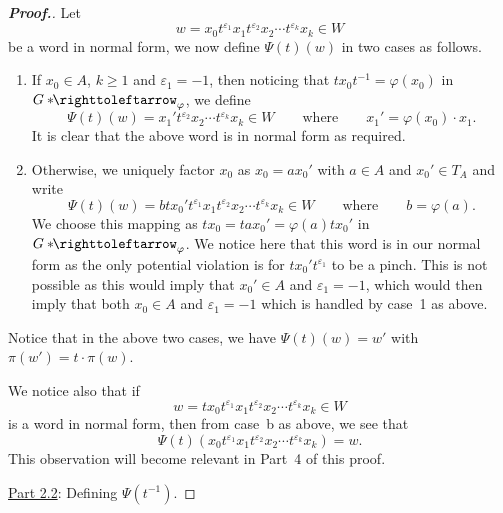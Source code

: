 \documentclass[11pt,a4paper,reqno]{amsart}
\theoremstyle{plain}
\theoremstyle{definition}
\theoremstyle{definition}
\renewcommand\geq\geqslant
\newenvironment{myproof}{\begin{proof}[\normalfont\bfseries Proof.]}{\end{proof}}
\newcommand\hnn{*\!\!\righttoleftarrow}
\begin{document}
\begin{myproof}
	\smallskip
	\noindent
	Let
	\[
		w = x_0 t^{\varepsilon_1} x_1 t^{\varepsilon_2} x_2 \cdots t^{\varepsilon_k} x_k \in W
	\]
	be a word in normal form, we now define $\Psi(t)(w)$ in two cases as follows.
	\begin{enumerate}[label=\alph*)]
		\item If $x_0 \in A$, $k\geq 1$ and $\varepsilon_1 = -1$, then noticing that $t x_0 t^{-1} = \varphi(x_0)$ in $G\hnn_\varphi$, we define
		      \[
			      \Psi(t)(w)
			      =
			      x_1' t^{\varepsilon_2} x_2 \cdots t^{\varepsilon_k} x_k \in W
			      \qquad
			      \text{where}
			      \qquad
			      x_1' = \varphi(x_0) \cdot x_1.
		      \]
		      It is clear that the above word is in normal form as required.
		\item Otherwise, we uniquely factor $x_0$ as $x_0 = a x_0'$ with $a\in A$ and $x_0'\in T_A$ and write
		      \[
			      \Psi(t)(w)
			      =
			      b t x_0' t^{\varepsilon_1} x_1 t^{\varepsilon_2} x_2 \cdots t^{\varepsilon_k} x_k \in W
			      \qquad
			      \text{where}
			      \qquad
			      b=\varphi(a).
		      \]
		      We choose this mapping as $tx_0 = tax_0' = \varphi(a)tx_0'$ in $G\hnn_\varphi$.
		      We notice here that this word is in our normal form as the only potential violation is for $tx_0' t^{\varepsilon_1}$ to be a pinch.
		      This is not possible as this would imply that $x_0' \in A$ and $\varepsilon_1=-1$, which would then imply that both $x_0\in A$ and $\varepsilon_1=-1$ which is handled by case~1 as above.
	\end{enumerate}
	Notice that in the above two cases, we have $\Psi(t)(w) = w'$ with $\pi(w') = t\cdot \pi(w)$.

	We notice also that if
	\[
		w=t x_0 t^{\varepsilon_1} x_1 t^{\varepsilon_2} x_2 \cdots t^{\varepsilon_k} x_k\in W
	\]
	is a word in normal form, then from case~b as above, we see that
	\[
		\Psi(t)(x_0 t^{\varepsilon_1} x_1 t^{\varepsilon_2} x_2 \cdots t^{\varepsilon_k} x_k)
		=
		w.
	\]
	This observation will become relevant in Part~4 of this proof.

	\medskip
	\noindent
	\underline{Part 2.2}: Defining $\Psi(t^{-1})$.
	\nopagebreak


\end{myproof}
\end{document}
